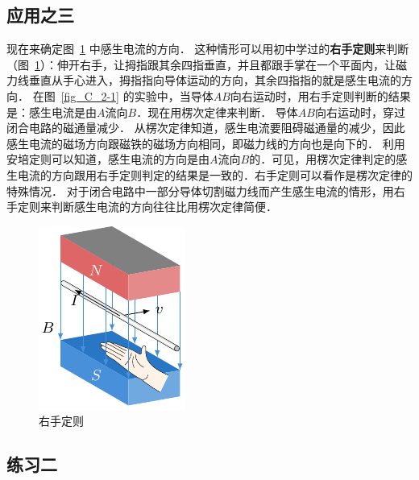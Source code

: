 \subsection*{应用之三} 


现在来确定图~\ref{fig_C_2-14} 中感生电流的方向．
这种情形可以用初中学过的\textbf{右手定则}来判断（图~\ref{fig_C_2-14}）：伸开右手，让拇指跟其余四指垂直，并且都跟手掌在一个平面内，让磁力线垂直从手心进入，拇指指向导体运动的方向，其余四指指的就是感生电流的方向．
在图~\ref{fig_C_2-1} 的实验中，当导体$AB$向右运动时，用右手定则判断的结果是：感生电流是由$A$流向$B$．现在用楞次定律来判断．
导体$AB$向右运动时，穿过闭合电路的磁通量减少．
从楞次定律知道，感生电流要阻碍磁通量的减少，因此感生电流的磁场方向跟磁铁的磁场方向相同，即磁力线的方向也是向下的．
利用安培定则可以知道，感生电流的方向是由$A$流向$B$的．可见，用楞次定律判定的感生电流的方向跟用右手定则判定的结果是一致的．右手定则可以看作是楞次定律的特殊情况．
对于闭合电路中一部分导体切割磁力线而产生感生电流的情形，用右手定则来判断感生电流的方向往往比用楞次定律简便．

\begin{figure}[htbp]
	\centering
	\includegraphics{fig/C/2-14.pdf}
	\caption{右手定则}\label{fig_C_2-14}
\end{figure}


\subsection*{练习二}

